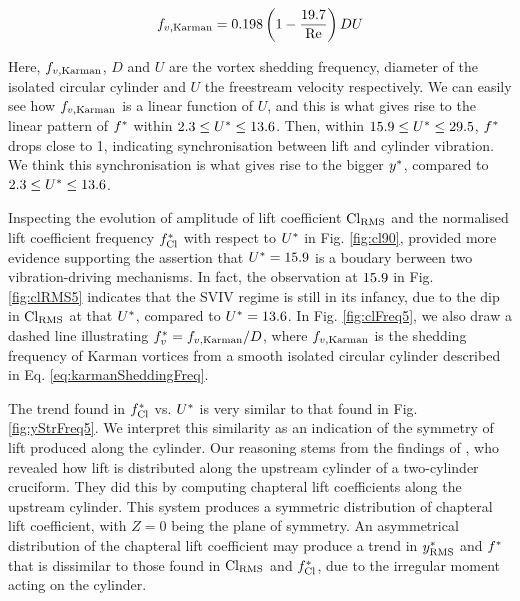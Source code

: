 \documentclass[oneside]{utmthesis}
\begin{document}
\begin{equation}
  f_{v,\text{Karman}} = 0.198 \left( 1 - \frac{19.7}{\text{Re}} \right) DU
  \label{eq:karmanSheddingFreq}
\end{equation}

\noindent Here, $f_{v,\text{Karman}}$, $D$ and $U$ are the vortex shedding frequency, diameter of the isolated circular cylinder and $U$ the freestream velocity respectively. We can easily see how $f_{v,\text{Karman}}$ is a linear function of $U$, and this is what gives rise to the linear pattern of $f^{*}$ within $2.3 \leq U^{*} \leq 13.6$. Then, within $15.9 \leq U^{*} \leq 29.5$, $f^{*}$ drops close to 1, indicating synchronisation between lift and cylinder vibration. We think this synchronisation is what gives rise to the bigger $y^{*}$, compared to $2.3 \leq U^{*} \leq 13.6$.

Inspecting the evolution of \rms{} amplitude of lift coefficient $\text{Cl}_{\text{RMS}}$ and the normalised lift coefficient frequency $f_{\text{Cl}}^{*}$ with respect to $U^{*}$ in Fig. \ref{fig:cl90}, provided more evidence supporting the assertion that $U^{*} = 15.9$ is a boudary berween two vibration-driving mechanisms. In fact, the observation at $15.9$ in Fig. \ref{fig:clRMS5} indicates that the SVIV regime is still in its infancy, due to the dip in $\text{Cl}_{\text{RMS}}$ at that $U^{*}$, compared to $U^{*} = 13.6$. In Fig. \ref{fig:clFreq5}, we also draw a dashed line illustrating $f^{*}_{v} = f_{v,\text{Karman}}/D$, where $f_{v,\text{Karman}}$ is the shedding frequency of Karman vortices from a smooth isolated circular cylinder described in Eq. \ref{eq:karmanSheddingFreq}.

The trend found in $f_{\text{Cl}}^{*}$ vs. $U^{*}$ is very similar to that found in Fig. \ref{fig:yStrFreq5}. We interpret this similarity as an indication of the symmetry of lift produced along the cylinder. Our reasoning stems from the findings of \citet{Zhao2018a}, who revealed how lift is distributed along the upstream cylinder of a two-cylinder \angfi{} cruciform. They did this by computing chapteral lift coefficients along the upstream cylinder. This system produces a symmetric distribution of chapteral lift coefficient, with $Z = 0$ being the plane of symmetry. An asymmetrical distribution of the chapteral lift coefficient may produce a trend in $y^{*}_{\text{RMS}}$ and $f^{*}$ that is dissimilar to those found in $\text{Cl}_{\text{RMS}}$ and $f_{\text{Cl}}^{*}$, due to the irregular moment acting on the cylinder.
\end{document}
